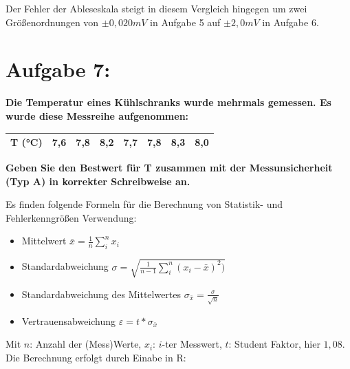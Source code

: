 \documentclass[
]{article}
\providecommand{\tightlist}{%
  \setlength{\itemsep}{0pt}\setlength{\parskip}{0pt}}
\begin{document}
Der Fehler der Ableseskala steigt in diesem Vergleich hingegen um zwei
Größenordnungen von \(\pm 0,020mV\) in Aufgabe 5 auf \(\pm 2,0mV\) in
Aufgabe 6.

\hypertarget{aufgabe-7}{%
\section{Aufgabe 7:}\label{aufgabe-7}}

\textbf{Die Temperatur eines Kühlschranks wurde mehrmals gemessen. Es
wurde diese Messreihe aufgenommen:}

\begin{longtable}[]{@{}llllllll@{}}
\toprule
\endhead
T (°C) & 7,6 & 7,8 & 8,2 & 7,7 & 7,8 & 8,3 & 8,0 \\
\bottomrule
\end{longtable}

\newpage

\textbf{Geben Sie den Bestwert für T zusammen mit der Messunsicherheit
(Typ A) in korrekter Schreibweise an.}

Es finden folgende Formeln für die Berechnung von Statistik- und
Fehlerkenngrößen Verwendung:

\begin{itemize}
\tightlist
\item
  Mittelwert \(\bar{x} = \frac{1}{n}\sum\limits_{i}^{n}x_i\)
\item
  Standardabweichung
  \(\sigma = \sqrt{\frac{1}{n-1}\sum\limits_{i}^{n}(x_i-\bar{x})^2)}\)
\item
  Standardabweichung des Mittelwertes
  \(\sigma_{\bar{x}} = \frac{\sigma}{\sqrt{n}}\)
\item
  Vertrauensabweichung \(\varepsilon = t*\sigma_{\bar{x}}\)
\end{itemize}

Mit \(n\): Anzahl der (Mess)Werte, \(x_i\): \(i\)-ter Messwert, \(t\):
Student Faktor, hier \(1,08\). Die Berechnung erfolgt durch Einabe in R:
\end{document}
